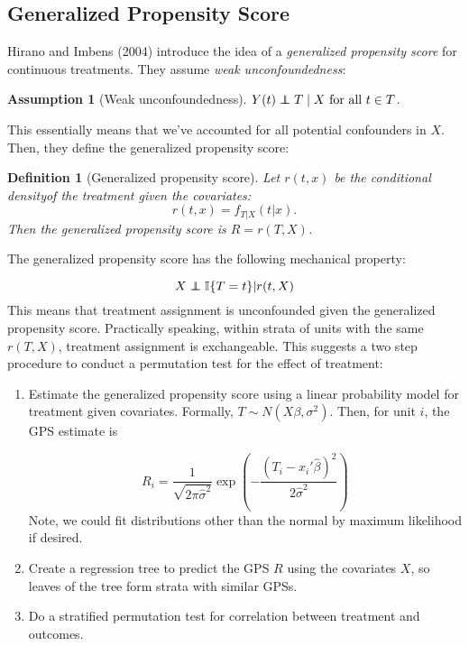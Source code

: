 \documentclass[11pt]{article}\usepackage[]{graphicx}\usepackage[]{color}
\newtheorem{assumption}{Assumption}
\newtheorem{definition}{Definition}
\newcommand{\ind}{\mathbb{I}} %
\newcommand{\normal}{N} %
\newcommand\independent{\protect\mathpalette{\protect\independenT}{\perp}}
\def\independenT#1#2{\mathrel{\rlap{$#1#2$}\mkern2mu{#1#2}}}
\begin{document}
\subsection{Generalized Propensity Score}
Hirano and Imbens (2004) introduce the idea of a \textit{generalized propensity score} for continuous treatments.
They assume \textit{weak unconfoundedness}:
\begin{assumption}[Weak unconfoundedness] $Y(t) \independent T \mid X \text{ for all } t \in T$.
\end{assumption}
This essentially means that we've accounted for all potential confounders in $X$.
Then, they define the generalized propensity score:

\begin{definition}[Generalized propensity score]
Let $r(t, x)$ be the conditional densityof the treatment given the covariates:
$$r(t, x) = f_{T | X} (t|x).$$ 
Then the generalized propensity score is $R = r(T, X)$.
\end{definition}

The generalized propensity score has the following mechanical property:

$$X \independent \ind\{T = t\} \vert r(t, X)$$
This means that treatment assignment is unconfounded given the generalized propensity score.
Practically speaking, within strata of units with the same $r(T, X)$, treatment assignment is exchangeable.
This suggests a two step procedure to conduct a permutation test for the effect of treatment:
\begin{enumerate}
\item Estimate the generalized propensity score using a linear probability model for treatment given covariates.
Formally, $T \sim \normal(X\beta, \sigma^2)$.
Then, for unit $i$, the GPS estimate is

$$ R_i = \frac{1}{\sqrt{2\pi\hat{\sigma}^2}}\exp\left(-\frac{(T_i - x_i'\hat{\beta})^2}{2\hat{\sigma}^2}\right)$$
Note, we could fit distributions other than the normal by maximum likelihood if desired. 
\item Create a regression tree to predict the GPS $R$ using the covariates $X$, so leaves of the tree form strata with similar GPSs.
\item Do a stratified permutation test for correlation between treatment and outcomes.
\end{enumerate}
\end{document}

